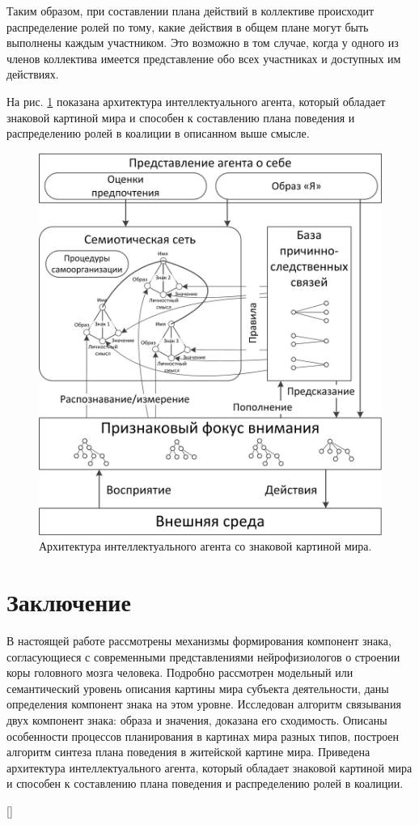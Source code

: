 \documentclass[a4paper, 12pt]{article}
\theoremstyle{plain}
\begin{document}
	Таким образом, при составлении плана действий в коллективе происходит распределение ролей по тому, какие действия в общем плане могут быть выполнены каждым участником. Это возможно в том случае, когда у одного из членов коллектива имеется представление обо всех участниках и доступных им действиях.
	
	На рис. \ref{fig:iagent} показана архитектура интеллектуального агента, который обладает знаковой картиной мира и способен к составлению плана поведения и распределению ролей в коалиции в описанном выше смысле.

	\begin{figure}[h]
		\centering
		\includegraphics[width=0.7\linewidth]{iagent.jpg}
		\caption{Архитектура интеллектуального агента со знаковой картиной мира.}
		\label{fig:iagent}
	\end{figure}

	\section*{Заключение} В настоящей работе рассмотрены механизмы формирования компонент знака, согласующиеся с современными представлениями нейрофизиологов о строении коры головного мозга человека. Подробно рассмотрен модельный или семантический уровень описания картины мира субъекта деятельности, даны определения компонент знака на этом уровне. Исследован алгоритм связывания двух компонент знака: образа и значения, доказана его сходимость. Описаны особенности процессов планирования в картинах мира разных типов, построен алгоритм синтеза плана поведения в житейской картине мира. Приведена архитектура интеллектуального агента, который обладает знаковой картиной мира и способен к составлению плана поведения и распределению ролей в коалиции.
	
	
	
	
\end{document}
